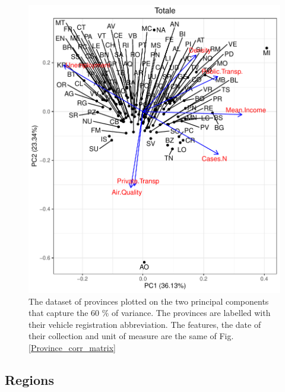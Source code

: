 \documentclass[
12pt, %
a4paper, %
oneside, %
headinclude,footinclude, %
BCOR5mm, %
]{scrartcl}
\begin{document}
\begin{figure}[h]
\begin{center}
\includegraphics[scale=1]{Pic/Provinces_PCA_FULL.pdf}
\caption{The dataset of provinces plotted on the two principal components that capture the 60 $\% $ of variance. The provinces are labelled with their vehicle registration abbreviation. The features, the date of their collection and unit of measure are the same of Fig. \ref{Province_corr_matrix} }
\label{Provinces_PCA_FULL}
\end{center}
\end{figure}

\clearpage

\subsection{Regions}












\renewcommand{\refname}{\spacedlowsmallcaps{References}} %




\end{document}
